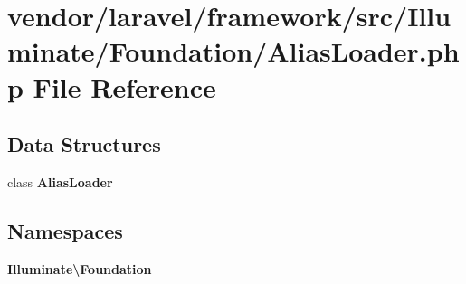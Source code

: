 \section{vendor/laravel/framework/src/\+Illuminate/\+Foundation/\+Alias\+Loader.php File Reference}
\label{_alias_loader_8php}
\subsection*{Data Structures}
\begin{DoxyCompactItemize}
\item 
class {\bf Alias\+Loader}
\end{DoxyCompactItemize}
\subsection*{Namespaces}
\begin{DoxyCompactItemize}
\item 
 {\bf Illuminate\textbackslash{}\+Foundation}
\end{DoxyCompactItemize}
